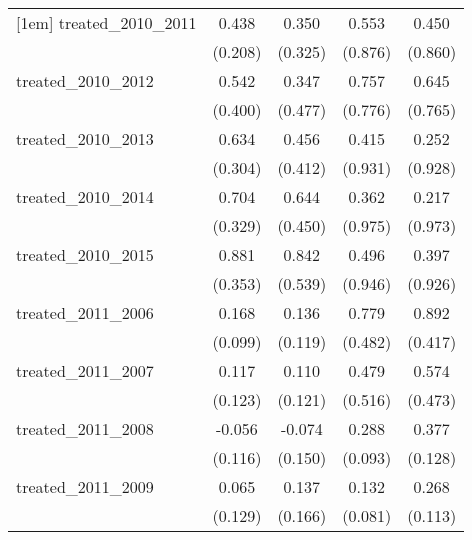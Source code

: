 {\begin{tabular}{l*{4}{c}}
[1em]
treated\_2010\_2011&       0.438\sym{*}  &       0.350         &       0.553         &       0.450         \\
            &     (0.208)         &     (0.325)         &     (0.876)         &     (0.860)         \\
[1em]
treated\_2010\_2012&       0.542         &       0.347         &       0.757         &       0.645         \\
            &     (0.400)         &     (0.477)         &     (0.776)         &     (0.765)         \\
[1em]
treated\_2010\_2013&       0.634\sym{*}  &       0.456         &       0.415         &       0.252         \\
            &     (0.304)         &     (0.412)         &     (0.931)         &     (0.928)         \\
[1em]
treated\_2010\_2014&       0.704\sym{*}  &       0.644         &       0.362         &       0.217         \\
            &     (0.329)         &     (0.450)         &     (0.975)         &     (0.973)         \\
[1em]
treated\_2010\_2015&       0.881\sym{*}  &       0.842         &       0.496         &       0.397         \\
            &     (0.353)         &     (0.539)         &     (0.946)         &     (0.926)         \\
[1em]
treated\_2011\_2006&       0.168         &       0.136         &       0.779         &       0.892\sym{*}  \\
            &     (0.099)         &     (0.119)         &     (0.482)         &     (0.417)         \\
[1em]
treated\_2011\_2007&       0.117         &       0.110         &       0.479         &       0.574         \\
            &     (0.123)         &     (0.121)         &     (0.516)         &     (0.473)         \\
[1em]
treated\_2011\_2008&      -0.056         &      -0.074         &       0.288\sym{**} &       0.377\sym{**} \\
            &     (0.116)         &     (0.150)         &     (0.093)         &     (0.128)         \\
[1em]
treated\_2011\_2009&       0.065         &       0.137         &       0.132         &       0.268\sym{*}  \\
            &     (0.129)         &     (0.166)         &     (0.081)         &     (0.113)         \\

\end{tabular}}
